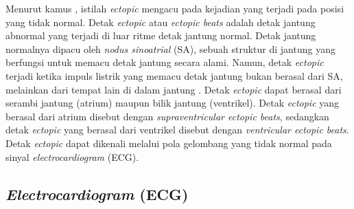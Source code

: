 


Menurut kamus \textcite{merriam-websterDefinitionECTOPIC2024}, istilah \textit{ectopic} mengacu pada kejadian yang terjadi pada posisi yang tidak normal.
Detak \textit{ectopic} atau \textit{ectopic beats} adalah detak jantung abnormal yang terjadi di luar ritme detak jantung normal.
Detak jantung normalnya dipacu oleh \textit{nodus sinoatrial} (SA), sebuah struktur di jantung yang berfungsi untuk memacu detak jantung secara alami.
Namun, detak \textit{ectopic} terjadi ketika impuls listrik yang memacu detak jantung bukan berasal dari SA, melainkan dari tempat lain di dalam jantung \parencite{mahidasaagarEctopicBeats}.
Detak \textit{ectopic} dapat berasal dari serambi jantung (atrium) maupun bilik jantung (ventrikel).
Detak \textit{ectopic} yang berasal dari atrium disebut dengan \textit{supraventricular ectopic beats}, sedangkan detak \textit{ectopic} yang berasal dari ventrikel disebut dengan \textit{ventricular ectopic beats}.
Detak \textit{ectopic} dapat dikenali melalui pola gelombang yang tidak normal pada sinyal \textit{electrocardiogram} (ECG).
%


\subsection{\emph{Electrocardiogram} (ECG)}
\label{subsec: landasan-ecg}


